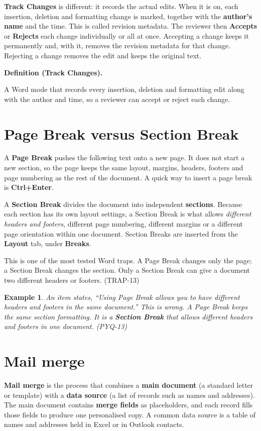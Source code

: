 \documentclass[11pt]{article}
\newtheorem{example}{Example}[section]
\newenvironment{definitionbox}[1]{%
  \par\noindent\textbf{Definition (#1).}\ \itshape
}{\par\vspace{0.3em}}
\begin{document}
\textbf{Track Changes} is different: it records the actual edits. When it is
on, each insertion, deletion and formatting change is marked, together with the
\textbf{author's name} and the time. This is called revision metadata. The
reviewer then \textbf{Accepts} or \textbf{Rejects} each change individually or
all at once. Accepting a change keeps it permanently and, with it, removes the
revision metadata for that change. Rejecting a change removes the edit and
keeps the original text.

\begin{definitionbox}{Track Changes}
A Word mode that records every insertion, deletion and formatting edit along
with the author and time, so a reviewer can accept or reject each change.
\end{definitionbox}

\section{Page Break versus Section Break}
A \textbf{Page Break} pushes the following text onto a new page. It does not
start a new section, so the page keeps the same layout, margins, headers,
footers and page numbering as the rest of the document. A quick way to insert a
page break is \textbf{Ctrl+Enter}.

A \textbf{Section Break} divides the document into independent
\textbf{sections}. Because each section has its own layout settings, a Section
Break is what allows \emph{different headers and footers}, different page
numbering, different margins or a different page orientation within one
document. Section Breaks are inserted from the \textbf{Layout} tab, under
\textbf{Breaks}.

This is one of the most tested Word traps. A Page Break changes only the page; a
Section Break changes the section. Only a Section Break can give a document two
different headers or footers. (TRAP-13)

\begin{example}
An item states, ``Using Page Break allows you to have different headers and
footers in the same document.'' This is wrong. A Page Break keeps the same
section formatting. It is a \textbf{Section Break} that allows different
headers and footers in one document. (PYQ-13)
\end{example}

\section{Mail merge}
\textbf{Mail merge} is the process that combines a \textbf{main document} (a
standard letter or template) with a \textbf{data source} (a list of records
such as names and addresses). The main document contains \textbf{merge fields}
as placeholders, and each record fills those fields to produce one personalised
copy. A common data source is a table of names and addresses held in Excel or
in Outlook contacts.
\end{document}
